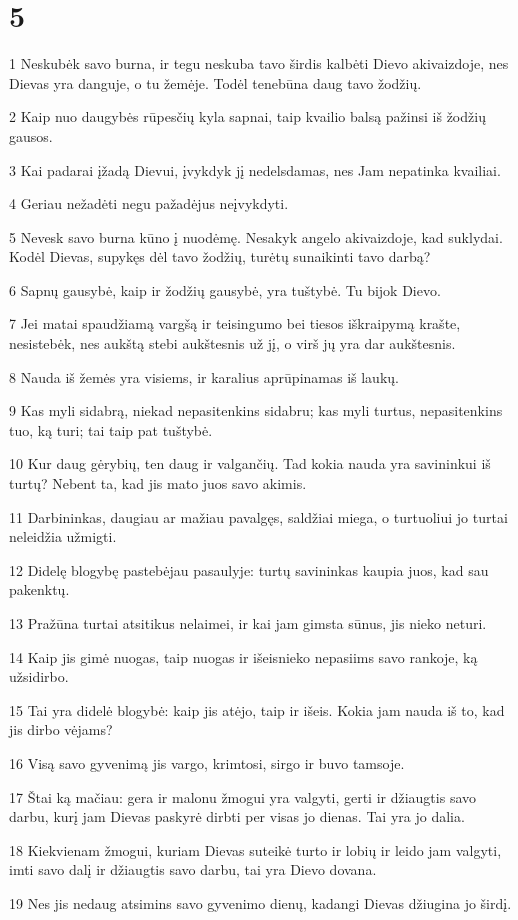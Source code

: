 \chapter{5}


\par 1 Neskubėk savo burna, ir tegu neskuba tavo širdis kalbėti Dievo akivaizdoje, nes Dievas yra danguje, o tu žemėje. Todėl tenebūna daug tavo žodžių. 
\par 2 Kaip nuo daugybės rūpesčių kyla sapnai, taip kvailio balsą pažinsi iš žodžių gausos. 
\par 3 Kai padarai įžadą Dievui, įvykdyk jį nedelsdamas, nes Jam nepatinka kvailiai. 
\par 4 Geriau nežadėti negu pažadėjus neįvykdyti. 
\par 5 Nevesk savo burna kūno į nuodėmę. Nesakyk angelo akivaizdoje, kad suklydai. Kodėl Dievas, supykęs dėl tavo žodžių, turėtų sunaikinti tavo darbą? 
\par 6 Sapnų gausybė, kaip ir žodžių gausybė, yra tuštybė. Tu bijok Dievo. 
\par 7 Jei matai spaudžiamą vargšą ir teisingumo bei tiesos iškraipymą krašte, nesistebėk, nes aukštą stebi aukštesnis už jį, o virš jų yra dar aukštesnis. 
\par 8 Nauda iš žemės yra visiems, ir karalius aprūpinamas iš laukų. 
\par 9 Kas myli sidabrą, niekad nepasitenkins sidabru; kas myli turtus, nepasitenkins tuo, ką turi; tai taip pat tuštybė. 
\par 10 Kur daug gėrybių, ten daug ir valgančių. Tad kokia nauda yra savininkui iš turtų? Nebent ta, kad jis mato juos savo akimis. 
\par 11 Darbininkas, daugiau ar mažiau pavalgęs, saldžiai miega, o turtuoliui jo turtai neleidžia užmigti. 
\par 12 Didelę blogybę pastebėjau pasaulyje: turtų savininkas kaupia juos, kad sau pakenktų. 
\par 13 Pražūna turtai atsitikus nelaimei, ir kai jam gimsta sūnus, jis nieko neturi. 
\par 14 Kaip jis gimė nuogas, taip nuogas ir išeis­nieko nepasiims savo rankoje, ką užsidirbo. 
\par 15 Tai yra didelė blogybė: kaip jis atėjo, taip ir išeis. Kokia jam nauda iš to, kad jis dirbo vėjams? 
\par 16 Visą savo gyvenimą jis vargo, krimtosi, sirgo ir buvo tamsoje. 
\par 17 Štai ką mačiau: gera ir malonu žmogui yra valgyti, gerti ir džiaugtis savo darbu, kurį jam Dievas paskyrė dirbti per visas jo dienas. Tai yra jo dalia. 
\par 18 Kiekvienam žmogui, kuriam Dievas suteikė turto ir lobių ir leido jam valgyti, imti savo dalį ir džiaugtis savo darbu, tai yra Dievo dovana. 
\par 19 Nes jis nedaug atsimins savo gyvenimo dienų, kadangi Dievas džiugina jo širdį.



